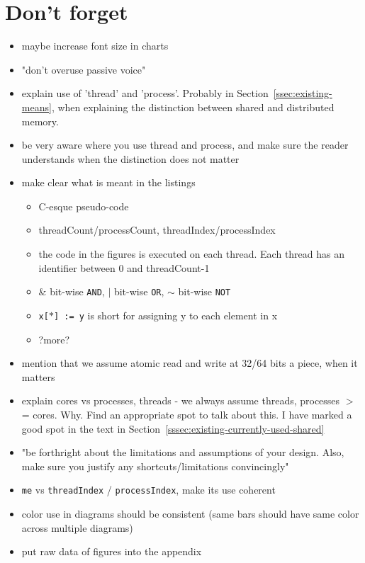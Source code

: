 \documentclass[a4paper, 10pt]{article}
\begin{document}
\section{Don't forget}
\begin{itemize}
	\item maybe increase font size in charts
	\item "don't overuse passive voice"
	\item explain use of 'thread' and 'process'. Probably in Section~\ref{ssec:existing-means}, when explaining the distinction between shared and distributed memory.
	\item be very aware where you use thread and process, and make sure the reader understands when the distinction does not matter
	\item make clear what is meant in the listings
		\begin{itemize}
			\item C-esque pseudo-code
			\item threadCount/processCount,  threadIndex/processIndex
			\item the code in the figures is executed on each thread. Each thread has an identifier between 0 and threadCount-1
			\item \& bit-wise \texttt{AND}, $|$ bit-wise \texttt{OR}, $\sim$ bit-wise \texttt{NOT}
			\item \texttt{x[$*$] := y} is short for assigning y to each element in x
			\item ?more?
		\end{itemize}
	\item mention that we assume atomic read and write at 32/64 bits a piece, when it matters
	\item explain cores vs processes, threads - we always assume threads, processes $>$= cores. Why. Find an appropriate spot to talk about this. I have marked a good spot in the text in Section~\ref{sssec:existing-currently-used-shared}
	\item "be forthright about the limitations and assumptions of your design. Also, make sure you justify any shortcuts/limitations convincingly"
	\item \texttt{me} vs \texttt{threadIndex} / \texttt{processIndex}, make its use coherent
	\item color use in diagrams should be consistent (same bars should have same color across multiple diagrams)
	\item put raw data of figures into the appendix
\end{itemize}
\end{document}
